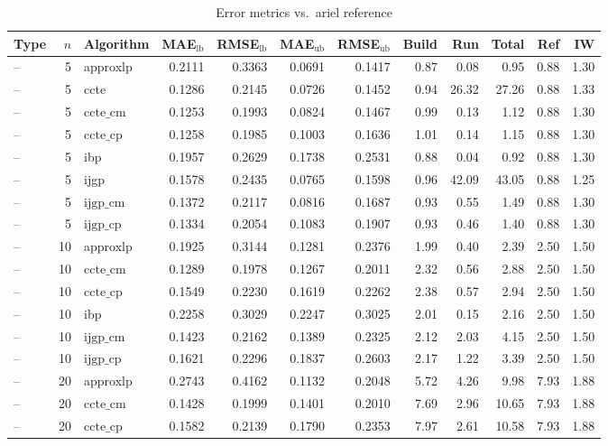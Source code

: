 \begin{table}[ht]
\centering
\scriptsize
\caption{Error metrics vs.\ ariel reference}
\begin{tabular}{lrlrrrrrrrrr}
\toprule
Type & $n$ & Algorithm & MAE$_{\text{lb}}$ & RMSE$_{\text{lb}}$ & MAE$_{\text{ub}}$ & RMSE$_{\text{ub}}$ & Build & Run & Total & Ref & IW \\
\midrule
-- & 5 & approxlp & 0.2111 & 0.3363 & 0.0691 & 0.1417 & 0.87 & 0.08 & 0.95 & 0.88 & 1.30 \\
-- & 5 & ccte & 0.1286 & 0.2145 & 0.0726 & 0.1452 & 0.94 & 26.32 & 27.26 & 0.88 & 1.33 \\
-- & 5 & $\text{ccte\_cm}$ & 0.1253 & 0.1993 & 0.0824 & 0.1467 & 0.99 & 0.13 & 1.12 & 0.88 & 1.30 \\
-- & 5 & $\text{ccte\_cp}$ & 0.1258 & 0.1985 & 0.1003 & 0.1636 & 1.01 & 0.14 & 1.15 & 0.88 & 1.30 \\
-- & 5 & ibp & 0.1957 & 0.2629 & 0.1738 & 0.2531 & 0.88 & 0.04 & 0.92 & 0.88 & 1.30 \\
-- & 5 & ijgp & 0.1578 & 0.2435 & 0.0765 & 0.1598 & 0.96 & 42.09 & 43.05 & 0.88 & 1.25 \\
-- & 5 & $\text{ijgp\_cm}$ & 0.1372 & 0.2117 & 0.0816 & 0.1687 & 0.93 & 0.55 & 1.49 & 0.88 & 1.30 \\
-- & 5 & $\text{ijgp\_cp}$ & 0.1334 & 0.2054 & 0.1083 & 0.1907 & 0.93 & 0.46 & 1.40 & 0.88 & 1.30 \\
-- & 10 & approxlp & 0.1925 & 0.3144 & 0.1281 & 0.2376 & 1.99 & 0.40 & 2.39 & 2.50 & 1.50 \\
-- & 10 & $\text{ccte\_cm}$ & 0.1289 & 0.1978 & 0.1267 & 0.2011 & 2.32 & 0.56 & 2.88 & 2.50 & 1.50 \\
-- & 10 & $\text{ccte\_cp}$ & 0.1549 & 0.2230 & 0.1619 & 0.2262 & 2.38 & 0.57 & 2.94 & 2.50 & 1.50 \\
-- & 10 & ibp & 0.2258 & 0.3029 & 0.2247 & 0.3025 & 2.01 & 0.15 & 2.16 & 2.50 & 1.50 \\
-- & 10 & $\text{ijgp\_cm}$ & 0.1423 & 0.2162 & 0.1389 & 0.2325 & 2.12 & 2.03 & 4.15 & 2.50 & 1.50 \\
-- & 10 & $\text{ijgp\_cp}$ & 0.1621 & 0.2296 & 0.1837 & 0.2603 & 2.17 & 1.22 & 3.39 & 2.50 & 1.50 \\
-- & 20 & approxlp & 0.2743 & 0.4162 & 0.1132 & 0.2048 & 5.72 & 4.26 & 9.98 & 7.93 & 1.88 \\
-- & 20 & $\text{ccte\_cm}$ & 0.1428 & 0.1999 & 0.1401 & 0.2010 & 7.69 & 2.96 & 10.65 & 7.93 & 1.88 \\
-- & 20 & $\text{ccte\_cp}$ & 0.1582 & 0.2139 & 0.1790 & 0.2353 & 7.97 & 2.61 & 10.58 & 7.93 & 1.88 \\

\end{tabular}
\end{table}
